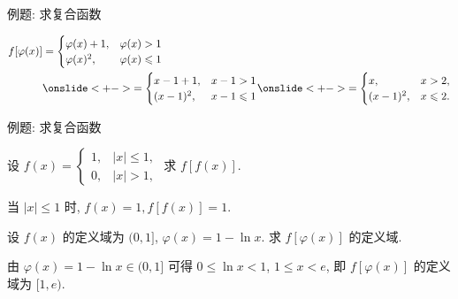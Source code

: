 \begin{frame}{例题: 求复合函数}
	\onslide<+->
	\begin{solution}
		\begin{align*}
			f[\varphi(x)]&=\begin{cases}
				\varphi(x)+1,&\varphi(x)>1\\
				\varphi(x)^2,&\varphi(x)\le 1
			\end{cases}\\
			&\onslide<+->{=\begin{cases}
				x-1+1,&x-1>1\\
				(x-1)^2,&x-1\le 1
			\end{cases}}
			\onslide<+->{=\begin{cases}
				x,&x>2,\\
				(x-1)^2,&x\le 2.
			\end{cases}}\\
		\end{align*}
		\vspace{-\baselineskip}
		\onslide<+->{
			\[\varphi[f(x)]=f(x)-1=\begin{cases}
				x,&x>1,\\
				x^2-1,&x\le 1.
			\end{cases}\]
		}
	\end{solution}
\end{frame}


\begin{frame}{例题: 求复合函数}
	\onslide<+->
	\begin{example}
		设 $f(x)=\begin{cases}
			1,&|x|\le 1,\\
			0,&|x|>1,
		\end{cases}$ 求 $f[f(x)]$.
	\end{example}
	\onslide<+->
	\begin{solution}
		当 $|x|\le 1$ 时, $f(x)=1,f[f(x)]=1$.
		\onslide<+->{故 $f[f(x)]=1$.
		}
	\end{solution}
	\onslide<+->
	\begin{example}
		设 $f(x)$ 的定义域为 $(0,1]$, $\varphi(x)=1-\ln x$. 求 $f[\varphi(x)]$ 的定义域.
	\end{example}
	\onslide<+->
	\begin{solution}
		由 $\varphi(x)=1-\ln x\in(0,1]$ 可得 $0\le \ln x<1$, $1\le x<e$, 即 $f[\varphi(x)]$ 的定义域为 $[1,e)$.
	\end{solution}
\end{frame}


